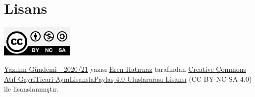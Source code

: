 \documentclass[11pt]{article}
\begin{document}
\section{Lisans}
\label{sec:org99233d0}
\begin{center}
\begin{center}
\includegraphics[height=1.5cm]{../../../img/CC_BY-NC-SA_4.0.png}
\end{center}

\href{yazilim-gundemi-2020-21.pdf}{Yazılım Gündemi - 2020/21} yazısı \href{https://erenhatirnaz.github.io}{Eren Hatırnaz} tarafından \href{http://creativecommons.org/licenses/by-nc-sa/4.0/}{Creative Commons
Atıf-GayriTicari-AynıLisanslaPaylaş 4.0 Uluslararası Lisansı} (CC BY-NC-SA 4.0)
ile lisanslanmıştır.
\end{center}
\end{document}
